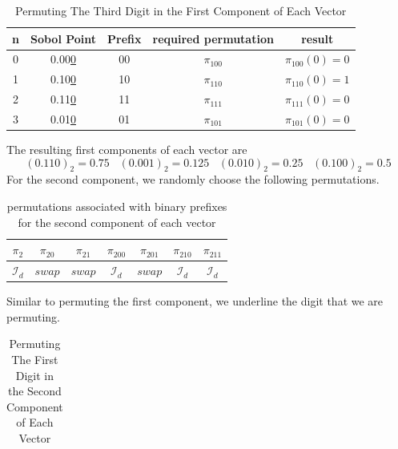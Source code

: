 \documentclass{article}
\theoremstyle{definition}
\begin{document}
\begin{appendices}
\begin{table}[H]
\begin{tabular}{|c|c|c|c|c|}
  \end{tabular}
\end{table}
\begin{table}[H]       %
  \centering            %
  \caption{Permuting The Third Digit in the First Component of Each Vector}
  \label{tab:3}
  \begin{tabular}{|c|c|c|c|c|}  %
    \hline
    n & Sobol Point & Prefix & required permutation & result \\ \hline
    0 & 0.00\underline{0} & 00 & $\pi_{100}$ & $\pi_{100}(0)=0$ \\ \hline
    1 & 0.10\underline{0} & 10 & $\pi_{110}$ & $\pi_{110}(0)=1$ \\ \hline
    2 & 0.11\underline{0} & 11 & $\pi_{111}$ & $\pi_{111}(0)=0$ \\ \hline
    3 & 0.01\underline{0} & 01 & $\pi_{101}$ & $\pi_{101}(0)=0$ \\ \hline
  \end{tabular}
\end{table}
\noindent The resulting first components of each vector are \begin{equation}
    (0.110)_2=0.75\;\;\;(0.001)_2=0.125\;\;\;(0.010)_2=0.25\;\;\;(0.100)_2=0.5
\end{equation}
For the second component, we randomly choose the following permutations.
\begin{table}[H]
\centering
\begin{tabular}{ccccccc}
\hline
$\pi_{2}$ & $\pi_{20}$ & $\pi_{21}$ & $\pi_{200}$ & $\pi_{201}$ & $\pi_{210}$ & $\pi_{211}$ \\
\hline
$\mathcal{I}_d$ 
& $\textit{swap}$ 
& $\textit{swap}$ 
& $\mathcal{I}_d$ 
& $\textit{swap}$ 
& $\mathcal{I}_d$ 
& $\mathcal{I}_d$ \\
\hline
\end{tabular}
\caption{permutations associated with binary prefixes for the second component of each vector}
\end{table}
\noindent Similar to permuting the first component, we underline the digit that we are permuting.
\begin{table}[H]       %
  \centering            %
  \caption{Permuting The First Digit in the Second Component of Each Vector}
  \label{tab:4}
  \begin{tabular}{|c|c|c|c|c|}  %
    \hline

\end{tabular}
\end{table}
\end{appendices}
\end{document}
